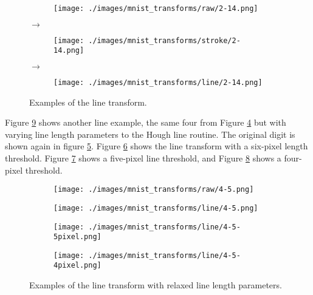 \begin{figure}[H]
    \begin{subfigure}{.15\columnwidth}
        \centering
        \texttt{[image: ./images/mnist\_transforms/raw/2-14.png]}
        \caption{}
        \label{fig:line_orig3}
    \end{subfigure}%
    $\rightarrow$
    \begin{subfigure}{.15\columnwidth}
        \centering
        \texttt{[image: ./images/mnist\_transforms/stroke/2-14.png]}
        \caption{}
        \label{fig:line_skel3}
    \end{subfigure}%
    $\rightarrow$
    \begin{subfigure}{.15\columnwidth}
        \centering
        \texttt{[image: ./images/mnist\_transforms/line/2-14.png]}
        \caption{}
        \label{fig:line_transform3}
    \end{subfigure}

    \caption{Examples of the line transform.}
    \label{fig:line_examples}
\end{figure}

Figure \ref{fig:line_pixels_examples} shows another line example, the same four
from Figure \ref{fig:line_examples} but with varying line length parameters to
the Hough line routine. The original digit is shown again in figure
\ref{fig:line_pixel_orig1}. Figure \ref{fig:line_pixel6} shows the line
transform with a six-pixel length threshold. Figure \ref{fig:line_pixel5} shows
a five-pixel line threshold, and Figure \ref{fig:line_pixel4} shows a four-pixel
threshold.

\begin{figure}[H]
    \centering

    \begin{subfigure}{.15\columnwidth}
        \centering
        \texttt{[image: ./images/mnist\_transforms/raw/4-5.png]}
        \caption{}
        \label{fig:line_pixel_orig1}
    \end{subfigure}%
    \begin{subfigure}{.15\columnwidth}
        \centering
        \texttt{[image: ./images/mnist\_transforms/line/4-5.png]}
        \caption{}
        \label{fig:line_pixel6}
    \end{subfigure}%
    \begin{subfigure}{.15\columnwidth}
        \centering
        \texttt{[image: ./images/mnist\_transforms/line/4-5-5pixel.png]}
        \caption{}
        \label{fig:line_pixel5}
    \end{subfigure}
    \begin{subfigure}{.15\columnwidth}
        \centering
        \texttt{[image: ./images/mnist\_transforms/line/4-5-4pixel.png]}
        \caption{}
        \label{fig:line_pixel4}
    \end{subfigure}%

    \caption{Examples of the line transform with relaxed line length parameters.}
    \label{fig:line_pixels_examples}
\end{figure}

